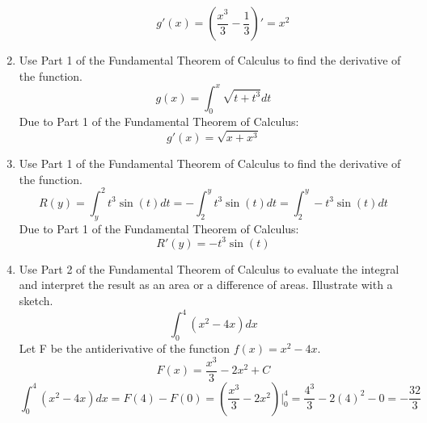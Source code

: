 \documentclass[12pt]{article}
\begin{document}
\begin{enumerate}
\begin{enumerate}
        \[g'(x) = (\frac{x^3}{3} - \frac{1}{3})' = x^2\]
        \begin{center}
        \end{center}
    \end{enumerate}
\setcounter{enumi}{8}
    \item Use Part 1 of the Fundamental Theorem of Calculus to find the derivative of the function.
    \[g(x) = \int_{0}^{x} \sqrt{t + t^3}dt\]
    Due to Part 1 of the Fundamental Theorem of Calculus:
    \[g'(x) = \sqrt{x+x^3}\]
\setcounter{enumi}{13}
    \item Use Part 1 of the Fundamental Theorem of Calculus to find the derivative of the function.
    \[R(y) = \int_{y}^{2} t^3 \sin (t) dt = -\int_{2}^{y} t^3 \sin (t) dt = \int_{2}^{y} - t^3 \sin (t) dt\]
    Due to Part 1 of the Fundamental Theorem of Calculus:
    \[R'(y) = - t^3 \sin (t)\]
\setcounter{enumi}{21}
    \item Use Part 2 of the Fundamental Theorem of Calculus to evaluate the integral and interpret the result as an area or a difference of areas. Illustrate with a sketch.
    \[\int_{0}^{4} (x^2-4x)dx\]
    Let F be the antiderivative of the function $f(x) = x^2 - 4x$.
    \[F(x) = \frac{x^3}{3} - 2x^2 + C\]
    \[\int_{0}^{4} (x^2-4x)dx = F(4) - F(0) = (\frac{x^3}{3} - 2x^2)|^4_0 = \frac{4^3}{3} - 2(4)^2 - 0 = -\frac{32}{3}\]
    \begin{center}
\end{center}
\end{enumerate}
\end{document}
